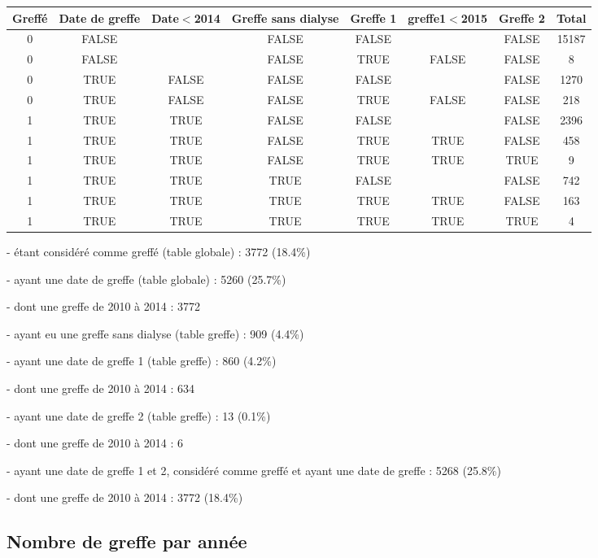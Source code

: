 \documentclass[11pt,a4paper]{article}\usepackage[]{graphicx}\usepackage[]{color}
\begin{document}
\begin{table}[H]
\centering
\begin{tabular}{cccccccc}
  \hline
Greffé & Date de greffe & Date$<$2014 & Greffe sans dialyse & Greffe 1 & greffe1$<$2015 & Greffe 2 & Total \\ 
  \hline
0 & FALSE &  & FALSE & FALSE &  & FALSE & 15187 \\ 
  0 & FALSE &  & FALSE & TRUE & FALSE & FALSE & 8 \\ 
  0 & TRUE & FALSE & FALSE & FALSE &  & FALSE & 1270 \\ 
  0 & TRUE & FALSE & FALSE & TRUE & FALSE & FALSE & 218 \\ 
  1 & TRUE & TRUE & FALSE & FALSE &  & FALSE & 2396 \\ 
  1 & TRUE & TRUE & FALSE & TRUE & TRUE & FALSE & 458 \\ 
  1 & TRUE & TRUE & FALSE & TRUE & TRUE & TRUE & 9 \\ 
  1 & TRUE & TRUE & TRUE & FALSE &  & FALSE & 742 \\ 
  1 & TRUE & TRUE & TRUE & TRUE & TRUE & FALSE & 163 \\ 
  1 & TRUE & TRUE & TRUE & TRUE & TRUE & TRUE & 4 \\ 
   \hline
\end{tabular}
\end{table}


- étant considéré comme greffé (table globale) : 3772 (18.4\%)

- ayant une date de greffe (table globale) : 5260 (25.7\%)

\qquad - dont une greffe de 2010 à 2014 : 3772

- ayant eu une greffe sans dialyse (table greffe) : 909 (4.4\%)

- ayant une date de greffe 1 (table greffe) : 860 (4.2\%)

\qquad - dont une greffe de 2010 à 2014 : 634

- ayant une date de greffe 2 (table greffe) : 13 (0.1\%)

\qquad - dont une greffe de 2010 à 2014 : 6

- ayant une date de greffe 1 et 2, considéré comme greffé et ayant une date de greffe : 5268 (25.8\%)

\qquad - dont une greffe de 2010 à 2014 : 3772 (18.4\%)

  \subsection{Nombre de greffe par année}
\end{document}
